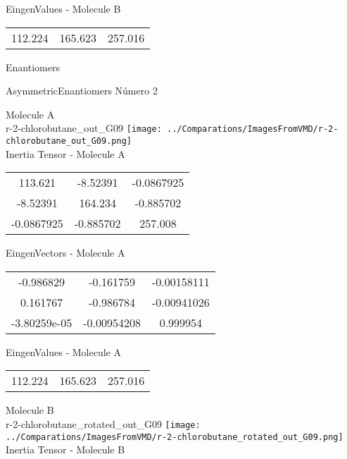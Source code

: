 \begin{multicols}{2}
\begin{center}
\vtab
 EingenValues - Molecule B     \\
\vtab
\begin{tabular}{|c c c|}
112.224	 & 	165.623	 & 	257.016	 \\
\end{tabular}

\end{center}
\end{multicols}
\begin{center}
\vtab
\vtab
\textcolor{NavyBlue}{\Large Enantiomers}
\end{center}

 \newpage

\vtab[-2cm]
\begin{center}
{\large AsymmetricEnantiomers \tab Número 2}
\end{center}
\begin{multicols}{2}
\begin{center}

Molecule A \\ 
r-2-chlorobutane\_out\_G09
\texttt{[image: ../Comparations/ImagesFromVMD/r-2-chlorobutane\_out\_G09.png]}
\\
Inertia Tensor - Molecule A \\
\vtab

\begin{tabular}{|c c c|}
113.621	 & 	-8.52391	 & 	-0.0867925	 \\
-8.52391	 & 	164.234	 & 	-0.885702	 \\
-0.0867925	 & 	-0.885702	 & 	257.008
\end{tabular}

\vtab
 EingenVectors - Molecule A     \\
\vtab
\begin{tabular}{|c c c|}
-0.986829	 & 	-0.161759	 & 	-0.00158111	 \\
0.161767	 & 	-0.986784	 & 	-0.00941026	 \\
-3.80259e-05	 & 	-0.00954208	 & 	0.999954
\end{tabular}

\vtab
 EingenValues - Molecule A     \\
\vtab
\begin{tabular}{|c c c|}
112.224	 & 	165.623	 & 	257.016	 \\
\end{tabular}
\columnbreak

Molecule B \\ 
r-2-chlorobutane\_rotated\_out\_G09
\texttt{[image: ../Comparations/ImagesFromVMD/r-2-chlorobutane\_rotated\_out\_G09.png]}
\\
Inertia Tensor - Molecule B \\
\vtab


\end{center}
\end{multicols}
